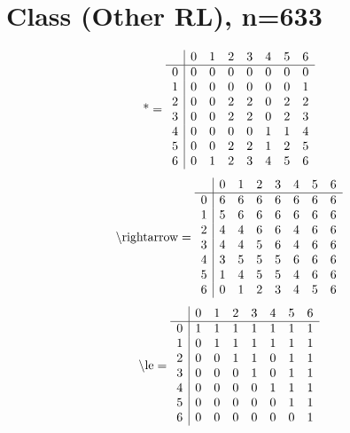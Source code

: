 \documentclass[11pt]{article}
\begin{document}
\section{Class (Other RL), n=633}
\[\text{*} = 
\begin{array}{r | r r r r r r r}
 & 0 & 1 & 2 & 3 & 4 & 5 & 6 \\ \hline
0 & 0 & 0 & 0 & 0 & 0 & 0 & 0 \\
1 & 0 & 0 & 0 & 0 & 0 & 0 & 1 \\
2 & 0 & 0 & 2 & 2 & 0 & 2 & 2 \\
3 & 0 & 0 & 2 & 2 & 0 & 2 & 3 \\
4 & 0 & 0 & 0 & 0 & 1 & 1 & 4 \\
5 & 0 & 0 & 2 & 2 & 1 & 2 & 5 \\
6 & 0 & 1 & 2 & 3 & 4 & 5 & 6 \\
\end{array}
\]
\[\text{\textbackslash rightarrow} = 
\begin{array}{r | r r r r r r r}
 & 0 & 1 & 2 & 3 & 4 & 5 & 6 \\ \hline
0 & 6 & 6 & 6 & 6 & 6 & 6 & 6 \\
1 & 5 & 6 & 6 & 6 & 6 & 6 & 6 \\
2 & 4 & 4 & 6 & 6 & 4 & 6 & 6 \\
3 & 4 & 4 & 5 & 6 & 4 & 6 & 6 \\
4 & 3 & 5 & 5 & 5 & 6 & 6 & 6 \\
5 & 1 & 4 & 5 & 5 & 4 & 6 & 6 \\
6 & 0 & 1 & 2 & 3 & 4 & 5 & 6 \\
\end{array}
\]
\[\text{\textbackslash le} = 
\begin{array}{r | r r r r r r r}
 & 0 & 1 & 2 & 3 & 4 & 5 & 6 \\ \hline
0 & 1 & 1 & 1 & 1 & 1 & 1 & 1 \\
1 & 0 & 1 & 1 & 1 & 1 & 1 & 1 \\
2 & 0 & 0 & 1 & 1 & 0 & 1 & 1 \\
3 & 0 & 0 & 0 & 1 & 0 & 1 & 1 \\
4 & 0 & 0 & 0 & 0 & 1 & 1 & 1 \\
5 & 0 & 0 & 0 & 0 & 0 & 1 & 1 \\
6 & 0 & 0 & 0 & 0 & 0 & 0 & 1 \\
\end{array}
\]
\end{document}
